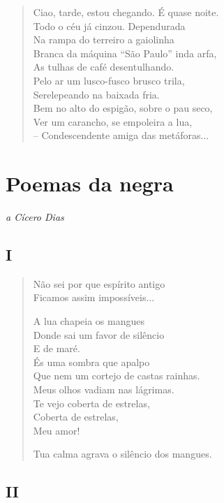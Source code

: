\begin{verse}
Ciao, tarde, estou chegando. É quase noite.\\
Todo o céu já cinzou. Dependurada\\
Na rampa do terreiro a gaiolinha\\
Branca da máquina ``São Paulo'' inda arfa,\\
As tulhas de café desentulhando.\\
Pelo ar um lusco-fusco brusco trila,\\
Serelepeando na baixada fria.\\
Bem no alto do espigão, sobre o pau seco,\\
Ver um carancho, se empoleira a lua,\\
-- Condescendente amiga das metáforas...
\end{verse}

\chapter[Poemas da negra]{Poemas da negra }

\begin{flushright}
\emph{a Cícero Dias}
\end{flushright}

\section{I}

\begin{verse}
Não sei por que espírito antigo\\
Ficamos assim impossíveis...

A lua chapeia os mangues\\
Donde sai um favor de silêncio\\
E de maré.\\
És uma sombra que apalpo\\
Que nem um cortejo de castas rainhas.\\
Meus olhos vadiam nas lágrimas.\\
Te vejo coberta de estrelas,\\
Coberta de estrelas,\\
Meu amor!

Tua calma agrava o silêncio dos mangues.
\end{verse}

\pagebreak
\section{II}

